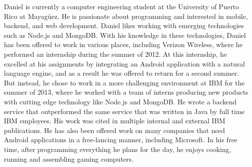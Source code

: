 
Daniel is currently a computer engineering student at the University of
Puerto Rico at Mayagüez. He is passionate about programming and interested in
mobile, backend, and web development. Daniel likes working with emerging
technologies such as Node.js and MongoDB. With his knowledge in these
technologies, Daniel has been offered to work in various places, including
Verizon Wireless, where he performed an internship during the summer of 2012. At
this internship, he excelled at his assignments by integrating an Android
application with a natural language engine, and as a result he was offered to
return for a second summer. But instead, he chose to work in a more challenging
environment at IBM for the summer of 2013, where he worked with a team of
interns producing new products with cutting edge technology like Node.js and
MongoDB. He wrote a backend service that outperformed the same service that was
written in Java by full time IBM employees. His work was cited in multiple
internal and external IBM publications. He has also been offered work on many
companies that need Android applications in a free-lancing manner, including
Microsoft. In his free time, after programming everything he plans for the day,
he enjoys cooking, running and assembling gaming computers.